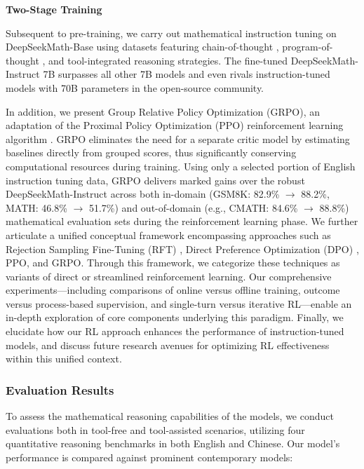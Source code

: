 \textbf{Two-Stage Training}

Subsequent to pre-training, we carry out mathematical instruction tuning on DeepSeekMath-Base using datasets featuring chain-of-thought \citep{cot}, program-of-thought \citep{pot,pal}, and tool-integrated reasoning \citep{tora} strategies. The fine-tuned DeepSeekMath-Instruct 7B surpasses all other 7B models and even rivals instruction-tuned models with 70B parameters in the open-source community.

In addition, we present Group Relative Policy Optimization (GRPO), an adaptation of the Proximal Policy Optimization (PPO) reinforcement learning algorithm \citep{schulman2017proximal}. GRPO eliminates the need for a separate critic model by estimating baselines directly from grouped scores, thus significantly conserving computational resources during training. Using only a selected portion of English instruction tuning data, GRPO delivers marked gains over the robust DeepSeekMath-Instruct across both in-domain (GSM8K: 82.9\% $\rightarrow$ 88.2\%, MATH: 46.8\% $\rightarrow$ 51.7\%) and out-of-domain (e.g., CMATH: 84.6\% $\rightarrow$ 88.8\%) mathematical evaluation sets during the reinforcement learning phase. We further articulate a unified conceptual framework encompassing approaches such as Rejection Sampling Fine-Tuning (RFT) \citep{yuan2023scaling}, Direct Preference Optimization (DPO) \citep{dpo}, PPO, and GRPO. Through this framework, we categorize these techniques as variants of direct or streamlined reinforcement learning. Our comprehensive experiments—including comparisons of online versus offline training, outcome versus process-based supervision, and single-turn versus iterative RL—enable an in-depth exploration of core components underlying this paradigm. Finally, we elucidate how our RL approach enhances the performance of instruction-tuned models, and discuss future research avenues for optimizing RL effectiveness within this unified context.

\subsubsection{Evaluation Results}

To assess the mathematical reasoning capabilities of the models, we conduct evaluations both in tool-free and tool-assisted scenarios, utilizing four quantitative reasoning benchmarks in both English and Chinese. Our model's performance is compared against prominent contemporary models:

